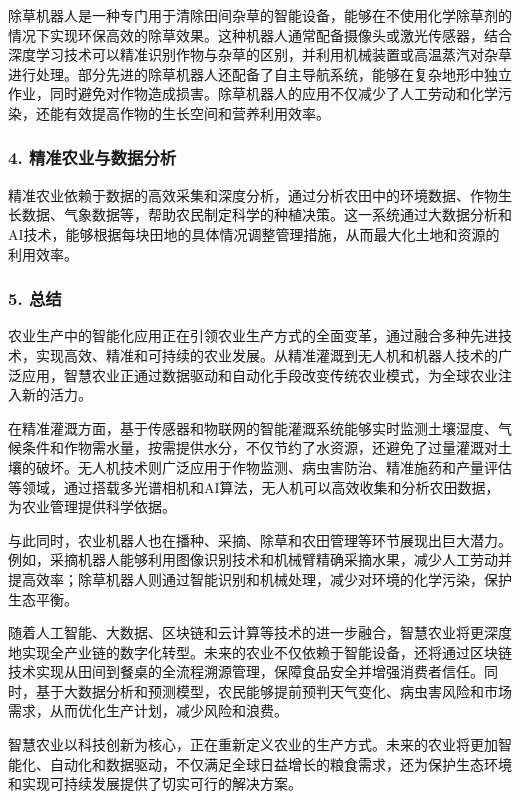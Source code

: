 除草机器人是一种专门用于清除田间杂草的智能设备，能够在不使用化学除草剂的情况下实现环保高效的除草效果。这种机器人通常配备摄像头或激光传感器，结合深度学习技术可以精准识别作物与杂草的区别，并利用机械装置或高温蒸汽对杂草进行处理。部分先进的除草机器人还配备了自主导航系统，能够在复杂地形中独立作业，同时避免对作物造成损害。除草机器人的应用不仅减少了人工劳动和化学污染，还能有效提高作物的生长空间和营养利用效率。

\subsubsection{4. 精准农业与数据分析}

精准农业依赖于数据的高效采集和深度分析，通过分析农田中的环境数据、作物生长数据、气象数据等，帮助农民制定科学的种植决策。这一系统通过大数据分析和AI技术，能够根据每块田地的具体情况调整管理措施，从而最大化土地和资源的利用效率。



\subsubsection{5. 总结}

农业生产中的智能化应用正在引领农业生产方式的全面变革，通过融合多种先进技术，实现高效、精准和可持续的农业发展。从精准灌溉到无人机和机器人技术的广泛应用，智慧农业正通过数据驱动和自动化手段改变传统农业模式，为全球农业注入新的活力。  

在精准灌溉方面，基于传感器和物联网的智能灌溉系统能够实时监测土壤湿度、气候条件和作物需水量，按需提供水分，不仅节约了水资源，还避免了过量灌溉对土壤的破坏。无人机技术则广泛应用于作物监测、病虫害防治、精准施药和产量评估等领域，通过搭载多光谱相机和AI算法，无人机可以高效收集和分析农田数据，为农业管理提供科学依据。  

与此同时，农业机器人也在播种、采摘、除草和农田管理等环节展现出巨大潜力。例如，采摘机器人能够利用图像识别技术和机械臂精确采摘水果，减少人工劳动并提高效率；除草机器人则通过智能识别和机械处理，减少对环境的化学污染，保护生态平衡。  

随着人工智能、大数据、区块链和云计算等技术的进一步融合，智慧农业将更深度地实现全产业链的数字化转型。未来的农业不仅依赖于智能设备，还将通过区块链技术实现从田间到餐桌的全流程溯源管理，保障食品安全并增强消费者信任。同时，基于大数据分析和预测模型，农民能够提前预判天气变化、病虫害风险和市场需求，从而优化生产计划，减少风险和浪费。  
  

智慧农业以科技创新为核心，正在重新定义农业的生产方式。未来的农业将更加智能化、自动化和数据驱动，不仅满足全球日益增长的粮食需求，还为保护生态环境和实现可持续发展提供了切实可行的解决方案。


